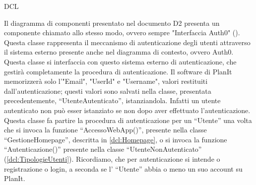 \begin{listaPersonale}{DCL}
    \begin{center}
        
    \end{center}
    \newpage


    Il diagramma di componenti presentato nel documento D2 presenta un componente chiamato allo stesso modo, ovvero sempre "Interfaccia Auth0" (). Questa classe rappresenta il meccanismo di autenticazione degli utenti attraverso il sistema esterno presente anche nel diagramma di contesto, ovvero Auth0. Questa classe si interfaccia con questo sistema esterno di autenticazione, che gestirà completamente la procedura di autenticazione. Il software di PlanIt memorizzerà solo l'"Email", "UserId" e "Username", valori restituiti dall'autenticazione; questi valori sono salvati nella classe, presentata precedentemente, “UtenteAutenticato”, istanziandola. Infatti un utente autenticato non può esser istanziato se non dopo aver effettuato l'autenticazione. \\
    Questa classe fa partire la procedura di autenticazione per un “Utente” una volta che si invoca la funzione “AccessoWebApp()”, presente nella classe “GestioneHomepage”, descritta in \ref{dcl:Homepage}, o si invoca la funzione “Autenticazione()” presente nella classe “UtenteNonAutenticato” (\ref{dcl:TipologieUtenti}). Ricordiamo, che per autenticazione si intende o registrazione o login, a seconda se l' “Utente” abbia o meno un suo account su PlanIt.


    \begin{center}
        
    \end{center}
    \newpage





\end{listaPersonale}
